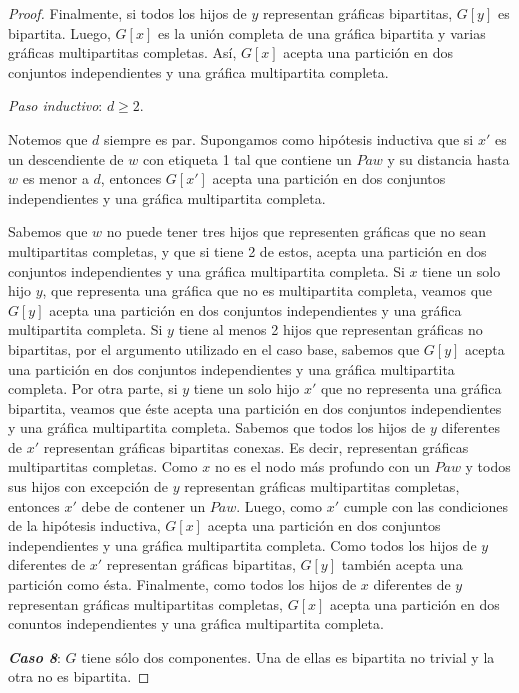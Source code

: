 \begin{proof}
Finalmente, si todos los hijos de $y$ representan gráficas bipartitas, $G[y]$ es bipartita. Luego, $G[x]$ es la unión completa de una gráfica bipartita y varias gráficas multipartitas completas. Así, $G[x]$ acepta una partición en dos conjuntos independientes y una gráfica multipartita completa. 

\emph{Paso inductivo}: $d\geq 2$.

Notemos que $d$ siempre es par. Supongamos como hipótesis inductiva que si $x'$ es un descendiente de $w$ con etiqueta 1 tal que contiene un $Paw$ y su distancia hasta $w$ es menor a $d$, entonces $G[x']$ acepta una partición en dos conjuntos independientes y una gráfica multipartita completa. 

Sabemos que $w$ no puede tener tres hijos que representen gráficas que no sean multipartitas completas, y que si tiene 2 de estos, acepta una partición en dos conjuntos independientes y una gráfica multipartita completa. Si $x$ tiene un solo hijo $y$, que representa una gráfica que no es multipartita completa, veamos que $G[y]$ acepta una partición en dos conjuntos independientes y una gráfica multipartita completa. Si $y$ tiene al menos 2 hijos que representan gráficas no bipartitas, por el argumento utilizado en el caso base, sabemos que $G[y]$ acepta una partición en dos conjuntos independientes y una gráfica multipartita completa. Por otra parte, si $y$ tiene un solo hijo $x'$ que no representa una gráfica bipartita, veamos que éste acepta una partición en dos conjuntos independientes y una gráfica multipartita completa. Sabemos que todos los hijos de $y$ diferentes de $x'$ representan gráficas bipartitas conexas. Es decir, representan gráficas multipartitas completas. Como $x$ no es el nodo más profundo con un $Paw$ y todos sus hijos con excepción de $y$ representan gráficas multipartitas completas, entonces $x'$ debe de contener un $Paw$. Luego, como $x'$ cumple con las condiciones de la hipótesis inductiva, $G[x]$ acepta una partición en dos conjuntos independientes y una gráfica multipartita completa. Como todos los hijos de $y$ diferentes de $x'$ representan gráficas bipartitas, $G[y]$ también acepta una partición como ésta. Finalmente, como todos los hijos de $x$ diferentes de $y$ representan gráficas multipartitas completas, $G[x]$ acepta una partición en dos conuntos independientes y una gráfica multipartita completa.
 
\emph{\textbf{Caso 8}}: $G$ tiene sólo dos componentes. Una de ellas es bipartita no trivial y la otra no es bipartita.


\end{proof}

